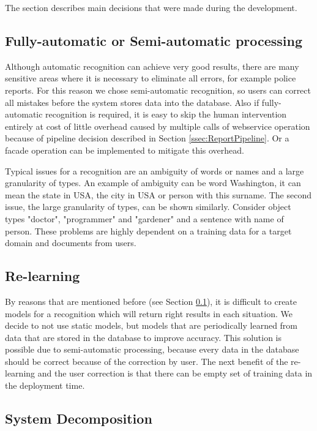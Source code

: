 
The section describes main decisions that were made during the development. 

\subsection{Fully-automatic or Semi-automatic processing}
\label{ssec:processing}

Although automatic recognition can achieve very good results, there are many
sensitive areas where it is necessary to eliminate all errors, for example
police reports. For this reason we chose semi-automatic recognition, so users
can correct all mistakes before the system stores data into the database. 
Also if fully-automatic recognition is required, it is easy
to skip the human intervention entirely at cost of little overhead caused by
multiple calls of webservice operation because of pipeline decision described in
Section \ref{ssec:ReportPipeline}. Or a facade operation can be implemented to
mitigate this overhead.

Typical issues for a recognition are an ambiguity of words or names and a large
granularity of types. An example of ambiguity can be word Washington, it can mean
the state in USA, the city in USA or person with this surname. The second issue,
the large granularity of types, can be shown similarly. Consider object types "doctor",
"programmer" and "gardener" and a sentence with name of person. These problems are
highly dependent on a training data for a target domain and documents from users.

\subsection{Re-learning}
By reasons that are mentioned before (see Section \ref{ssec:processing}), it is difficult
to create models for a recognition which will return right results in each situation.
We decide to not use static models, but models that are periodically learned from
data that are stored in the database to improve accuracy. This solution is possible
due to semi-automatic processing, because every data in the database should be
correct because of the correction by user. The next benefit of the re-learning and
the user correction is that there can be empty set of training data in the deployment
time.

\subsection{System Decomposition}

